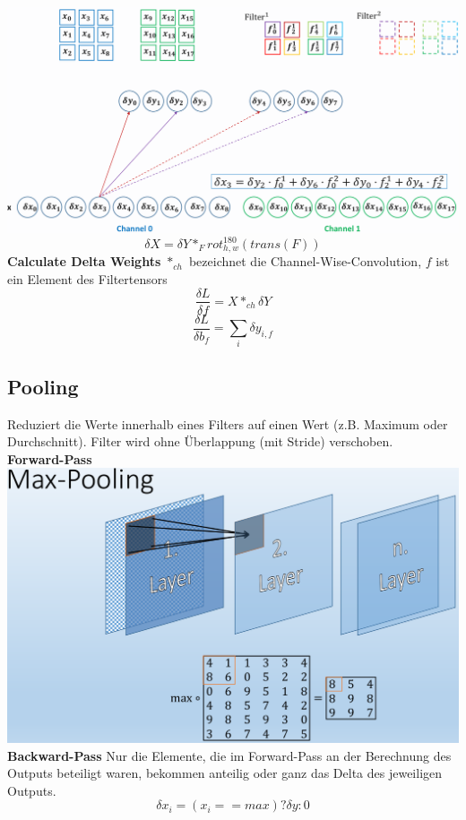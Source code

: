 \documentclass[12pt]{article}
\begin{document}
	\includegraphics[width=\linewidth]{figures/convolution-backward.png}
	$$\delta X = \delta Y *_F rot^{180}_{h,w}(trans(F))$$
	\textbf{Calculate Delta Weights} $*_{ch}$ bezeichnet die Channel-Wise-Convolution, $f$ ist ein Element des Filtertensors
	$$\frac{\delta L}{\delta f} = X *_{ch} \delta Y$$
	$$\frac{\delta L}{\delta b_f} = \sum_i \delta y_{i,f}$$
	\subsection{Pooling}
	Reduziert die Werte innerhalb eines Filters auf einen Wert (z.B. Maximum oder Durchschnitt). Filter wird ohne Überlappung (mit Stride) verschoben.\\
	\textbf{Forward-Pass}\\
	\includegraphics[width=\linewidth]{figures/max-pooling.png}\\
	\textbf{Backward-Pass} Nur die Elemente, die im Forward-Pass an der Berechnung des Outputs beteiligt waren, bekommen anteilig oder ganz das Delta des jeweiligen Outputs.
	$$\delta x_i = (x_i == max) ? \delta y : 0$$
\end{document}

